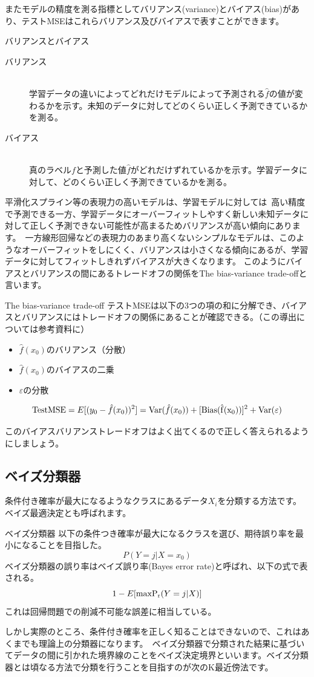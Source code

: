 \documentclass[uplatex]{jsarticle}
\begin{document}
またモデルの精度を測る指標としてバリアンス(variance)とバイアス(bias)があり、テストMSEはこれらバリアンス及びバイアスで表すことができます。
\begin{itembox}[l]{バリアンスとバイアス}
  \begin{description}
    \item [バリアンス]\mbox{}\\
    学習データの違いによってどれだけモデルによって予測される$\hat{f}$の値が変わるかを示す。未知のデータに対してどのくらい正しく予測できているかを測る。
    \item [バイアス]\mbox{}\\
    真のラベル$f$と予測した値$\hat{f}$がどれだけずれているかを示す。学習データに対して、どのくらい正しく予測できているかを測る。
  \end{description}
\end{itembox}
平滑化スプライン等の表現力の高いモデルは、学習モデルに対しては\
高い精度で予測できる一方、学習データにオーバーフィットしやすく新しい未知データに対して正しく予測できない可能性が高まるためバリアンスが高い傾向にあります。\
一方線形回帰などの表現力のあまり高くないシンプルなモデルは、このようなオーバーフィットをしにくく、バリアンスは小さくなる傾向にあるが、学習データに対してフィットしきれずバイアスが大きくなります。
このようにバイアスとバリアンスの間にあるトレードオフの関係をThe bias-variance trade-offと言います。
\begin{itembox}[l]{The bias-variance trade-off}
  テストMSEは以下の3つの項の和に分解でき、バイアスとバリアンスにはトレードオフの関係にあることが確認できる。（この導出については参考資料に）
  \begin{itemize}
    \item $\hat{f}(x_0)$のバリアンス（分散）
    \item $\hat{f}(x_0)$のバイアスの二乗
    \item $\varepsilon$の分散
  \end{itemize}
  $${\rm Test MSE} = E[(y_0 - \hat{f}(x_0))^2] = {\rm Var}(\hat{f}(x_0)) + [{\rm Bias (\hat{f}(x_0))}]^2 + {\rm Var}(\varepsilon)$$
\end{itembox}
このバイアスバリアンストレードオフはよく出てくるので正しく答えられるようにしましょう。

\subsection{ベイズ分類器}
条件付き確率が最大になるようなクラスにあるデータ$X_i$を分類する方法です。ベイズ最適決定とも呼ばれます。
\begin{itembox}[l]{ベイズ分類器}
  以下の条件つき確率が最大になるクラスを選び、期待誤り率を最小になることを目指した。
  $$P(Y = j|X = x_0)$$
  ベイズ分類器の誤り率はベイズ誤り率(Bayes error rate)と呼ばれ、以下の式で表される。\
  $$1 - E[{\rm max P_r}(Y = j|X)]$$
  これは回帰問題での削減不可能な誤差に相当している。
\end{itembox}
しかし実際のところ、条件付き確率を正しく知ることはできないので、これはあくまでも理論上の分類器になります。\
ベイズ分類器で分類された結果に基づいてデータの間に引かれた境界線のことをベイズ決定境界といいます。ベイズ分類器とは頃なる方法で分類を行うことを目指すのが次のK最近傍法です。
\end{document}
